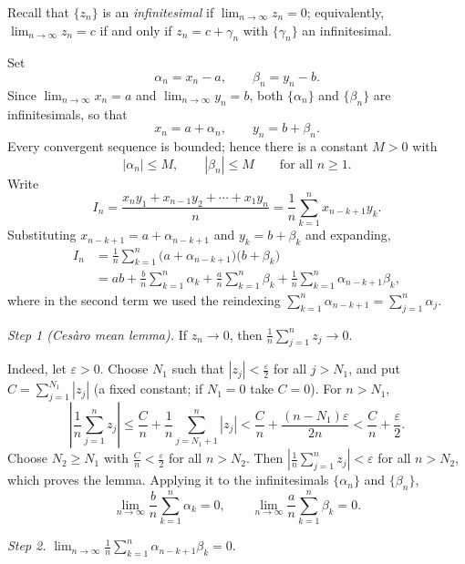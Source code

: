 \documentclass[11pt,a4paper]{article}
\newenvironment{solution}[1]{%
  \par\addvspace{1.7ex}%
  \noindent{\color{solutioncolor}\textbf{#1}}\hspace{0.55em}\ignorespaces}%
  {\par\addvspace{0.9ex}}
\begin{document}
\begin{solution}{Solution 2.1.21}\label{es:2.1.21}
Recall that $\{z_{n}\}$ is an \emph{infinitesimal} if $\lim_{n\to\infty}z_{n}=0$;
equivalently, $\lim_{n\to\infty}z_{n}=c$ if and only if $z_{n}=c+\gamma_{n}$ with
$\{\gamma_{n}\}$ an infinitesimal.

Set
\[
\alpha_{n}=x_{n}-a,\qquad \beta_{n}=y_{n}-b .
\]
Since $\lim_{n\to\infty}x_{n}=a$ and $\lim_{n\to\infty}y_{n}=b$, both
$\{\alpha_{n}\}$ and $\{\beta_{n}\}$ are infinitesimals, so that
\[
x_{n}=a+\alpha_{n},\qquad y_{n}=b+\beta_{n}.
\]
Every convergent sequence is bounded; hence there is a constant $M>0$ with
\[
|\alpha_{n}|\leq M,\qquad |\beta_{n}|\leq M\qquad\text{for all } n\geq 1 .
\]
Write
\[
I_{n}=\frac{x_{n}y_{1}+x_{n-1}y_{2}+\cdots+x_{1}y_{n}}{n}
=\frac{1}{n}\sum_{k=1}^{n}x_{n-k+1}y_{k}.
\]
Substituting $x_{n-k+1}=a+\alpha_{n-k+1}$ and $y_{k}=b+\beta_{k}$ and expanding,
\[
\begin{aligned}
I_{n}
&=\frac{1}{n}\sum_{k=1}^{n}\bigl(a+\alpha_{n-k+1}\bigr)\bigl(b+\beta_{k}\bigr)\\
&=ab+\frac{b}{n}\sum_{k=1}^{n}\alpha_{k}+\frac{a}{n}\sum_{k=1}^{n}\beta_{k}
   +\frac{1}{n}\sum_{k=1}^{n}\alpha_{n-k+1}\beta_{k},
\end{aligned}
\]
where in the second term we used the reindexing
$\sum_{k=1}^{n}\alpha_{n-k+1}=\sum_{j=1}^{n}\alpha_{j}$.

\emph{Step 1 (Ces\`aro mean lemma).} If $z_{n}\to 0$, then
$\frac{1}{n}\sum_{j=1}^{n}z_{j}\to 0$.

Indeed, let $\varepsilon>0$. Choose $N_{1}$ such that $|z_{j}|<\frac{\varepsilon}{2}$
for all $j>N_{1}$, and put $C=\sum_{j=1}^{N_{1}}|z_{j}|$ (a fixed constant; if
$N_{1}=0$ take $C=0$). For $n>N_{1}$,
\[
\left|\frac{1}{n}\sum_{j=1}^{n}z_{j}\right|
\leq \frac{C}{n}+\frac{1}{n}\sum_{j=N_{1}+1}^{n}|z_{j}|
<\frac{C}{n}+\frac{(n-N_{1})\varepsilon}{2n}
<\frac{C}{n}+\frac{\varepsilon}{2}.
\]
Choose $N_{2}\geq N_{1}$ with $\frac{C}{n}<\frac{\varepsilon}{2}$ for all $n>N_{2}$.
Then $\left|\frac{1}{n}\sum_{j=1}^{n}z_{j}\right|<\varepsilon$ for all $n>N_{2}$,
which proves the lemma. Applying it to the infinitesimals $\{\alpha_{n}\}$ and
$\{\beta_{n}\}$,
\[
\lim_{n\to\infty}\frac{b}{n}\sum_{k=1}^{n}\alpha_{k}=0,
\qquad
\lim_{n\to\infty}\frac{a}{n}\sum_{k=1}^{n}\beta_{k}=0 .
\]

\emph{Step 2.} $\displaystyle\lim_{n\to\infty}\frac{1}{n}\sum_{k=1}^{n}
\alpha_{n-k+1}\beta_{k}=0$.


\end{solution}
\end{document}
